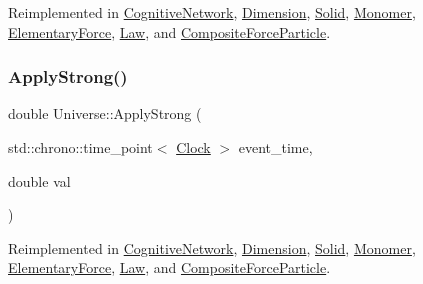 Reimplemented in \mbox{\hyperlink{classCognitiveNetwork_a7d3252977440a9a5c004f748647ce885}{Cognitive\+Network}}, \mbox{\hyperlink{classDimension_a9474b0dd3f6321a92bfe4375bb4b2266}{Dimension}}, \mbox{\hyperlink{classSolid_af2b3133138ce2482faa462d07aa23042}{Solid}}, \mbox{\hyperlink{classMonomer_a8747945cc2f7abd7ce0885345ad14ebc}{Monomer}}, \mbox{\hyperlink{classElementaryForce_a655a2c9489bfbbf15e05ba4953628134}{Elementary\+Force}}, \mbox{\hyperlink{classLaw_a04efdc724335219ab0affdcffb55eea2}{Law}}, and \mbox{\hyperlink{classCompositeForceParticle_ae26a03c2970a3825e8583a811339b28d}{Composite\+Force\+Particle}}.

\mbox{\label{classUniverse_a906a88b37f10bfa630bef49dfd0e907a}} 
\subsubsection{\texorpdfstring{Apply\+Strong()}{ApplyStrong()}}
{\footnotesize\ttfamily double Universe\+::\+Apply\+Strong (\begin{DoxyParamCaption}\item[{std\+::chrono\+::time\+\_\+point$<$ \mbox{\hyperlink{universe_8h_a0ef8d951d1ca5ab3cfaf7ab4c7a6fd80}{Clock}} $>$}]{event\+\_\+time,  }\item[{double}]{val }\end{DoxyParamCaption})\hspace{0.3cm}{\ttfamily [virtual]}}



Reimplemented in \mbox{\hyperlink{classCognitiveNetwork_a7a55750d3c42a277c4ffe04a87ab3b19}{Cognitive\+Network}}, \mbox{\hyperlink{classDimension_a621e8f7f24db86e836c5b3da0f019290}{Dimension}}, \mbox{\hyperlink{classSolid_a0801ec0382bc509191575bcf9f5c83c1}{Solid}}, \mbox{\hyperlink{classMonomer_acba5091693082fdf2d28f1a5a4ae19a1}{Monomer}}, \mbox{\hyperlink{classElementaryForce_a8a16bff6b5df2b0ff918262bf6376ade}{Elementary\+Force}}, \mbox{\hyperlink{classLaw_ab38659b209055df7e59f4bcd1b9e545a}{Law}}, and \mbox{\hyperlink{classCompositeForceParticle_ac1464a04fbbca2d8927dfdbef0429878}{Composite\+Force\+Particle}}.

\mbox{\label{classUniverse_a62789bcff84bd750b0366004381e2fdd}} 
